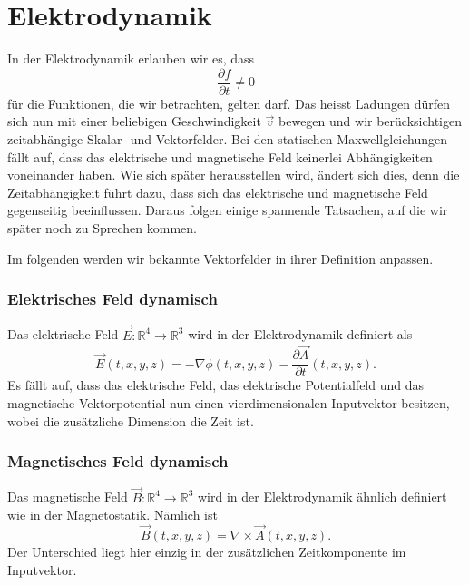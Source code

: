 %
%
%
%
\section{Elektrodynamik\label{section:maxwell:elektrodynmaik}}
In der Elektrodynamik erlauben wir es, dass
\[
\frac{\partial f}{\partial t}
\neq
0
\]
für die Funktionen, die wir betrachten, gelten darf.
Das heisst Ladungen dürfen sich nun mit einer beliebigen Geschwindigkeit $\vec{v}$ bewegen und wir berücksichtigen zeitabhängige Skalar- und Vektorfelder.
Bei den statischen Maxwellgleichungen fällt auf, dass das elektrische und magnetische Feld keinerlei Abhängigkeiten voneinander haben.
Wie sich später herausstellen wird, ändert sich dies, denn die Zeitabhängigkeit führt dazu, dass sich das elektrische und magnetische Feld gegenseitig beeinflussen.
Daraus folgen einige spannende Tatsachen, auf die wir später noch zu Sprechen kommen.
 
Im folgenden werden wir bekannte Vektorfelder in ihrer Definition anpassen.

\subsubsection{Elektrisches Feld dynamisch}
Das elektrische Feld
\(
\vec{E}: \mathbb{R}^4 \rightarrow \mathbb{R}^3
\)
wird in der Elektrodynamik definiert als
\begin{equation}
	\vec{E}(t,x,y,z)
	=
	- \nabla\phi(t,x,y,z) - \frac{\partial \vec{A}}{\partial t}(t,x,y,z).
	\label{maxwell:section:definiton_dynamisch_elektrischesFeld}
\end{equation}
Es fällt auf, dass das elektrische Feld, das elektrische Potentialfeld und das magnetische Vektorpotential nun einen vierdimensionalen Inputvektor besitzen, wobei die zusätzliche Dimension die Zeit ist.

\subsubsection{Magnetisches Feld dynamisch}
Das magnetische Feld
\(
\vec{B}: \mathbb{R}^4 \rightarrow \mathbb{R}^3
\)
wird in der Elektrodynamik ähnlich definiert wie in der Magnetostatik. Nämlich ist
\begin{equation}
	\vec{B}(t,x,y,z)
	=
	\nabla \times \vec{A}(t,x,y,z).
\end{equation}
Der Unterschied liegt hier einzig in der zusätzlichen Zeitkomponente im Inputvektor.

